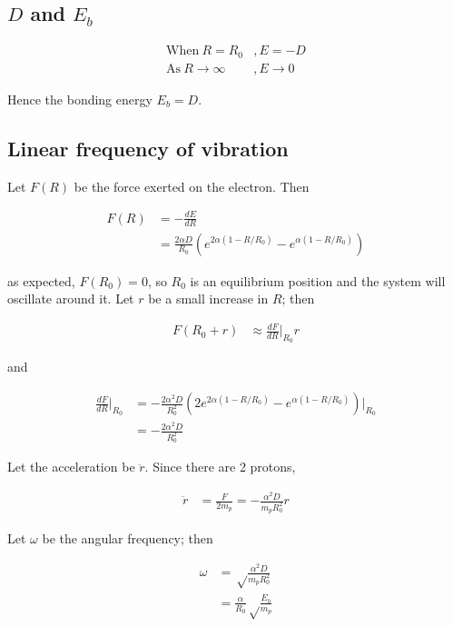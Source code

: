 \documentclass{article}
\begin{document}
\subsection{$D$ and $E_b$}

\begin{align*}
\mathrm{When}\ R = R_0&, E = -D \\
\mathrm{As}\ R \rightarrow \infty&, E \rightarrow 0
\end{align*}

Hence the bonding energy $E_b = D$.

\subsection{Linear frequency of vibration}

Let $F(R)$ be the force exerted on the electron. Then

\begin{align*}
F(R) &= -\frac{dE}{dR} \\
&= \frac{2\alpha D}{R_0}\left(e^{2\alpha(1-R/R_0)} - e^{\alpha(1 - R/R_0)}\right)
\end{align*}

as expected, $F(R_0) = 0$, so $R_0$ is an equilibrium position and the system will oscillate around it. Let $r$ be a small increase in $R$; then

\begin{align*}
F(R_0 + r) &\approx \frac{dF}{dR}\Big|_{R_0} r
\end{align*}

and

\begin{align*}
\frac{dF}{dR}\Big|_{R_0} &= -\frac{2\alpha^2D}{R_0^2} \left(2e^{2\alpha(1-R/R_0)} - e^{\alpha(1-R/R_0)}\right) \Big|_{R_0} \\
&= -\frac{2\alpha^2D}{R_0^2}
\end{align*}

Let the acceleration be $\ddot{r}$. Since there are 2 protons,

\begin{align*}
\ddot{r} &= \frac{F}{2m_p} = -\frac{\alpha^2D}{m_pR_0^2} r
\end{align*}

Let $\omega$ be the angular frequency; then 

\begin{align*}
\omega &= \sqrt\frac{\alpha^2D}{m_pR_0^2} \\
&= \frac{\alpha}{R_0}\sqrt\frac{E_b}{m_p}
\end{align*}
\end{document}
